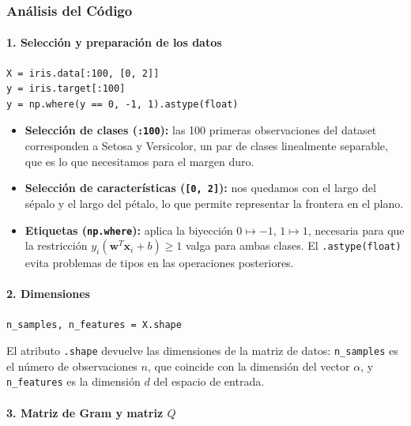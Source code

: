 \documentclass[12pt, a4paper]{article}
\begin{document}
\subsubsection{Análisis del Código}
\paragraph{1. Selección y preparación de los datos}

\begin{lstlisting}
X = iris.data[:100, [0, 2]]
y = iris.target[:100]
y = np.where(y == 0, -1, 1).astype(float)
\end{lstlisting}

\begin{itemize}
    \item \textbf{Selección de clases (\texttt{:100}):} las 100 primeras observaciones del dataset corresponden a Setosa y Versicolor, un par de clases linealmente separable, que es lo que necesitamos para el margen duro.
    \item \textbf{Selección de características (\texttt{[0, 2]}):} nos quedamos con el largo del sépalo y el largo del pétalo, lo que permite representar la frontera en el plano.
    \item \textbf{Etiquetas (\texttt{np.where}):} aplica la biyección $0 \mapsto -1$, $1 \mapsto 1$, necesaria para que la restricción $y_i(\mathbf{w}^T \mathbf{x}_i + b) \geq 1$ valga para ambas clases. El \texttt{.astype(float)} evita problemas de tipos en las operaciones posteriores.
\end{itemize}

\paragraph{2. Dimensiones}

\begin{lstlisting}
n_samples, n_features = X.shape
\end{lstlisting}

\noindent El atributo \texttt{.shape} devuelve las dimensiones de la matriz de datos: \texttt{n\_samples} es el número de observaciones $n$, que coincide con la dimensión del vector $\alpha$, y \texttt{n\_features} es la dimensión $d$ del espacio de entrada.

\paragraph{3. Matriz de Gram y matriz $Q$}
\end{document}
